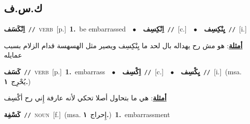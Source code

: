 \documentclass[10pt,a4paper,twoside]{article} %
\begin{document}
\begin{multicols}{2}
\vspace{-3mm}
\subsection*{\color{blue}\foreignlanguage{arabic}{ك.س.ف}\color{blue}{}} 

{\setlength\topsep{0pt}\textbf{\foreignlanguage{arabic}{اِنْكَسَف}}\ {\color{gray}\texttt{//}\color{black}}\ \textsc{verb}\ [p.]\ \textbf{1.}~be embarrassed\ \ $\bullet$\ \ \setlength\topsep{0pt}\textbf{\foreignlanguage{arabic}{اِنْكِسِف}}\ {\color{gray}\texttt{//}\color{black}}\ [c.]\ \ $\bullet$\ \ \setlength\topsep{0pt}\textbf{\foreignlanguage{arabic}{يِنْكِسِف}}\ {\color{gray}\texttt{//}\color{black}}\ [i.]\  \begin{flushright}\color{gray}\foreignlanguage{arabic}{\textbf{\underline{\foreignlanguage{arabic}{أمثلة}}}: هو مش رح يهداله بال لحد ما يِنْكِسِف ويصير مثل الهسهسة قدام الزلام بسبب عمايله}\end{flushright}\color{black}} \vspace{2mm}

{\setlength\topsep{0pt}\textbf{\foreignlanguage{arabic}{كَسَف}}\ {\color{gray}\texttt{//}\color{black}}\ \textsc{verb}\ [p.]\ \textbf{1.}~embarrass\ \ $\bullet$\ \ \setlength\topsep{0pt}\textbf{\foreignlanguage{arabic}{اِكْسِف}}\ {\color{gray}\texttt{//}\color{black}}\ [c.]\ \ $\bullet$\ \ \setlength\topsep{0pt}\textbf{\foreignlanguage{arabic}{يِكْسِف}}\ {\color{gray}\texttt{//}\color{black}}\ [i.]\ \color{gray}(msa. \foreignlanguage{arabic}{يُحْرِج}~\foreignlanguage{arabic}{\textbf{١.}})\color{black}\  \begin{flushright}\color{gray}\foreignlanguage{arabic}{\textbf{\underline{\foreignlanguage{arabic}{أمثلة}}}: هي ما بتحاول أصلا تحكي لأنه عارفة إِني رح أكْسِف}\end{flushright}\color{black}} \vspace{2mm}

{\setlength\topsep{0pt}\textbf{\foreignlanguage{arabic}{كَسْفِة}}\ {\color{gray}\texttt{//}\color{black}}\ \textsc{noun}\ [f.]\ \color{gray}(msa. \foreignlanguage{arabic}{إِحراج}~\foreignlanguage{arabic}{\textbf{١.}})\color{black}\ \textbf{1.}~embarrassment\ } \vspace{2mm}


\end{multicols}
\end{document}
